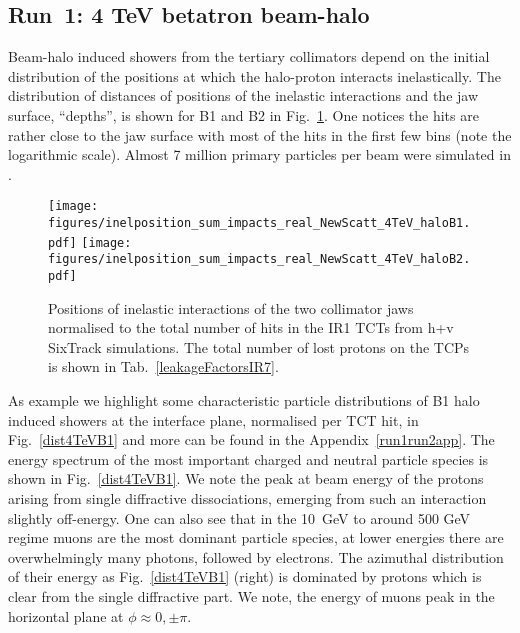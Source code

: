 \subsection{Run~1: 4 TeV betatron beam-halo}

Beam-halo induced showers from the tertiary collimators depend on the initial distribution of the positions at which the halo-proton interacts inelastically.
The distribution of distances of positions of the inelastic interactions and the jaw surface, ``depths'', is shown for B1 and B2 in Fig.~\ref{inel4TeV}. One notices the hits are rather close to the jaw surface with most of the hits in the first few bins (note the logarithmic scale). Almost 7 million primary particles per beam were simulated in \fluka.

\begin{figure}[!htb]
\centering
\texttt{[image: figures/inelposition\_sum\_impacts\_real\_NewScatt\_4TeV\_haloB1.pdf]}
\texttt{[image: figures/inelposition\_sum\_impacts\_real\_NewScatt\_4TeV\_haloB2.pdf]}
 \caption{Positions of inelastic interactions of the two collimator jaws normalised to the total number of hits in the IR1 TCTs from h+v SixTrack simulations. The total number of lost protons on the TCPs is shown in Tab.~\ref{leakageFactorsIR7}.
  \label{inel4TeV}}
\end{figure}

As example we highlight some characteristic particle distributions of B1 halo induced showers at the interface plane, normalised per TCT hit, in Fig.~\ref{dist4TeVB1} and more can be found in the Appendix~\ref{run1run2app}. The energy spectrum of the most important charged and neutral particle species is shown in Fig.~\ref{dist4TeVB1}. We note the peak at beam energy of the protons arising from single diffractive dissociations, emerging from such an interaction slightly off-energy. One can also see that in the 10~GeV to around 500 GeV regime muons are the most dominant particle species, at lower energies there are overwhelmingly many photons, followed by electrons. The azimuthal distribution of their energy as Fig.~\ref{dist4TeVB1} (right) is dominated by protons which is clear from the single diffractive part. We note, the energy of muons peak in the horizontal plane at $\phi \approx 0, \pm \pi$. 

